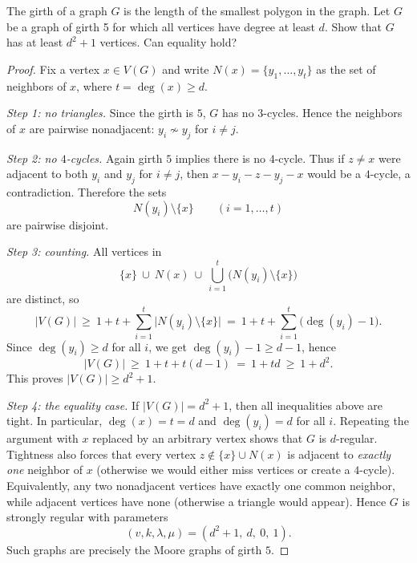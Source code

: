 \documentclass[11pt, a4paper]{ctexrep}
\begin{document}
\begin{exercise}
    The girth of a graph $G$ is the length of the smallest polygon in the graph. Let $G$ be a graph of girth 5 for which all vertices have degree at least $d$. Show that $G$ has at least $d^2+1$ vertices. Can equality hold?
\end{exercise}

\begin{proof}
    Fix a vertex $x\in V(G)$ and write $N(x)=\{y_{1},\dots,y_{t}\}$ as the set of neighbors of $x$, where $t=\deg(x)\ge d$.

    \noindent\emph{Step 1: no triangles.}
    Since the girth is $5$, $G$ has no $3$-cycles. Hence the neighbors of $x$ are pairwise nonadjacent:
    $y_i\not\sim y_j$ for $i\neq j$.

    \noindent\emph{Step 2: no $4$-cycles.}
    Again girth $5$ implies there is no $4$-cycle. Thus if $z\neq x$ were adjacent to both $y_i$ and $y_j$
    for $i\neq j$, then $x-y_i-z-y_j-x$ would be a $4$-cycle, a contradiction. Therefore the sets
    \[
        N(y_i)\setminus\{x\}\qquad (i=1,\dots,t)
    \]
    are pairwise disjoint.

    \noindent\emph{Step 3: counting.}
    All vertices in
    \[
        \{x\}\ \cup\ N(x)\ \cup\ \bigcup_{i=1}^{t}\bigl(N(y_i)\setminus\{x\}\bigr)
    \]
    are distinct, so
    \[
        |V(G)|\ \ge\ 1+t+\sum_{i=1}^{t}\bigl|N(y_i)\setminus\{x\}\bigr|
        \ =\ 1+t+\sum_{i=1}^{t}\bigl(\deg(y_i)-1\bigr).
    \]
    Since $\deg(y_i)\ge d$ for all $i$, we get $\deg(y_i)-1\ge d-1$, hence
    \[
        |V(G)|\ \ge\ 1+t+t(d-1)\ =\ 1+td\ \ge\ 1+d^{2}.
    \]
    This proves $|V(G)|\ge d^{2}+1$.

    \noindent\emph{Step 4: the equality case.}
    If $|V(G)|=d^{2}+1$, then all inequalities above are tight. In particular, $\deg(x)=t=d$ and
    $\deg(y_i)=d$ for all $i$. Repeating the argument with $x$ replaced by an arbitrary vertex shows that
    $G$ is $d$-regular. Tightness also forces that every vertex $z\notin \{x\}\cup N(x)$ is adjacent to
    \emph{exactly one} neighbor of $x$ (otherwise we would either miss vertices or create a $4$-cycle).
    Equivalently, any two nonadjacent vertices have exactly one common neighbor, while adjacent vertices
    have none (otherwise a triangle would appear). Hence $G$ is strongly regular with parameters
    \[
        (v,k,\lambda,\mu)=(d^{2}+1,\ d,\ 0,\ 1).
    \]
    Such graphs are precisely the Moore graphs of girth $5$.


\end{proof}
\end{document}
